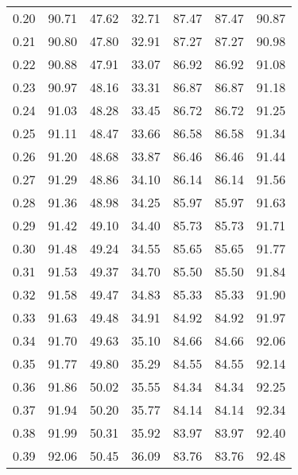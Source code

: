 \begin{tabular}{|c|c|c|c|c|c|c|}
      0.20 &     90.71 &     47.62 &      32.71 &   87.47 &      87.47 &         90.87 \\
      0.21 &     90.80 &     47.80 &      32.91 &   87.27 &      87.27 &         90.98 \\
      0.22 &     90.88 &     47.91 &      33.07 &   86.92 &      86.92 &         91.08 \\
      0.23 &     90.97 &     48.16 &      33.31 &   86.87 &      86.87 &         91.18 \\
      0.24 &     91.03 &     48.28 &      33.45 &   86.72 &      86.72 &         91.25 \\
      0.25 &     91.11 &     48.47 &      33.66 &   86.58 &      86.58 &         91.34 \\
      0.26 &     91.20 &     48.68 &      33.87 &   86.46 &      86.46 &         91.44 \\
      0.27 &     91.29 &     48.86 &      34.10 &   86.14 &      86.14 &         91.56 \\
      0.28 &     91.36 &     48.98 &      34.25 &   85.97 &      85.97 &         91.63 \\
      0.29 &     91.42 &     49.10 &      34.40 &   85.73 &      85.73 &         91.71 \\
      0.30 &     91.48 &     49.24 &      34.55 &   85.65 &      85.65 &         91.77 \\
      0.31 &     91.53 &     49.37 &      34.70 &   85.50 &      85.50 &         91.84 \\
      0.32 &     91.58 &     49.47 &      34.83 &   85.33 &      85.33 &         91.90 \\
      0.33 &     91.63 &     49.48 &      34.91 &   84.92 &      84.92 &         91.97 \\
      0.34 &     91.70 &     49.63 &      35.10 &   84.66 &      84.66 &         92.06 \\
      0.35 &     91.77 &     49.80 &      35.29 &   84.55 &      84.55 &         92.14 \\
      0.36 &     91.86 &     50.02 &      35.55 &   84.34 &      84.34 &         92.25 \\
      0.37 &     91.94 &     50.20 &      35.77 &   84.14 &      84.14 &         92.34 \\
      0.38 &     91.99 &     50.31 &      35.92 &   83.97 &      83.97 &         92.40 \\
      0.39 &     92.06 &     50.45 &      36.09 &   83.76 &      83.76 &         92.48 \\

\end{tabular}
